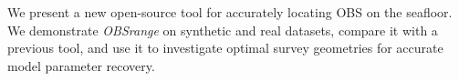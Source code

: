 We present a new open-source tool for accurately locating OBS on the seafloor. We demonstrate \textit{OBSrange} on synthetic and real datasets, compare it with a previous tool, and use it to investigate optimal survey geometries for accurate model parameter recovery.